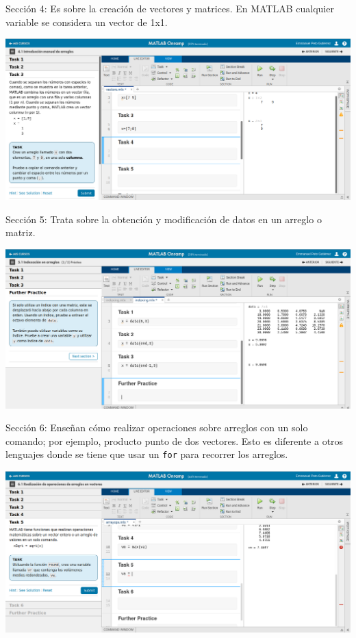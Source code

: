 \documentclass{article}
\begin{document}
Sección 4: Es sobre la creación de vectores y matrices. En MATLAB cualquier variable se considera un vector de 1x1.

\includegraphics[width=\linewidth]{imagenes/4}

Sección 5: Trata sobre la obtención y modificación de datos en un arreglo o matriz.

\includegraphics[width=\linewidth]{imagenes/5}

Sección 6: Enseñan cómo realizar operaciones sobre arreglos con un solo comando; por ejemplo, producto punto de dos vectores. Esto es diferente a otros lenguajes donde se tiene que usar un \texttt{for} para recorrer los arreglos.

\includegraphics[width=\linewidth]{imagenes/6}
\end{document}
